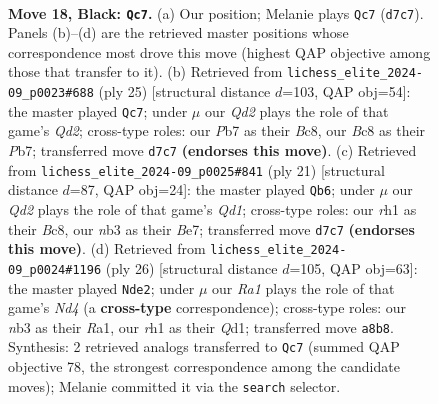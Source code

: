 \documentclass[11pt]{article}
\begin{document}
\begin{figure}[p]
\label{fig:thought-m33}
\end{figure}

\clearpage

\begin{figure}[p]\centering
\begin{subfigure}{0.46\textwidth}\centering
\resizebox{\linewidth}{!}{%
\newchessgame
\chessboard[
  setfen={r1b2kr1/1p1qbp1p/p3n1p1/2Ppn3/8/1NK3N1/PP3PPP/1RBQ1B1R b - - 5 18},
  showmover=false,
  pgfstyle=straightmove, color=movearrow, markmove={d7-c7}
]}
\caption{}
\end{subfigure}\hfill
\begin{subfigure}{0.46\textwidth}\centering
\resizebox{\linewidth}{!}{%
\newchessgame
\chessboard[
  setfen={r1b1k2r/1p1q1ppp/p2bpn2/8/8/1N1B4/PPP2PPP/R1BQR1K1 b kq - 5 13},
  showmover=false,
  pgfstyle=straightmove, color=movearrow, markmove={d7-c7}
]}
\caption{}
\end{subfigure}
\\[4pt]
\begin{subfigure}{0.46\textwidth}\centering
\resizebox{\linewidth}{!}{%
\newchessgame
\chessboard[
  setfen={r1bq1rk1/pp2bpp1/2n2n1p/3p4/7B/2NQPN2/PP2BPPP/R3K2R b KQ - 1 11},
  showmover=false,
  pgfstyle=straightmove, color=movearrow, markmove={d8-b6}
]}
\caption{}
\end{subfigure}\hfill
\begin{subfigure}{0.46\textwidth}\centering
\resizebox{\linewidth}{!}{%
\newchessgame
\chessboard[
  setfen={r2qrbk1/pppb1pp1/3p1nnp/8/P2NP3/2N3PP/1PP2PB1/R1BQR1K1 w - - 0 14},
  showmover=false,
  pgfstyle=straightmove, color=movearrow, markmove={d4-e2}
]}
\caption{}
\end{subfigure}
\caption{\textbf{Move 18, Black: \texttt{Qc7}.} (a) Our position; Melanie plays \texttt{Qc7} (\texttt{d7c7}). Panels (b)--(d) are the retrieved master positions whose correspondence most drove this move (highest QAP objective among those that transfer to it). (b) Retrieved from \texttt{lichess\_elite\_2024-09\_p0023\#688} (ply 25) [structural distance $d$=103, QAP obj=54]: the master played \texttt{Qc7}; under $\mu$ our \emph{Qd2} plays the role of that game's \emph{Qd2}; cross-type roles: our \emph{P}b7 as their \emph{B}c8, our \emph{B}c8 as their \emph{P}b7; transferred move \texttt{d7c7} \textbf{(endorses this move)}. (c) Retrieved from \texttt{lichess\_elite\_2024-09\_p0025\#841} (ply 21) [structural distance $d$=87, QAP obj=24]: the master played \texttt{Qb6}; under $\mu$ our \emph{Qd2} plays the role of that game's \emph{Qd1}; cross-type roles: our \emph{r}h1 as their \emph{B}c8, our \emph{n}b3 as their \emph{B}e7; transferred move \texttt{d7c7} \textbf{(endorses this move)}. (d) Retrieved from \texttt{lichess\_elite\_2024-09\_p0024\#1196} (ply 26) [structural distance $d$=105, QAP obj=63]: the master played \texttt{Nde2}; under $\mu$ our \emph{Ra1} plays the role of that game's \emph{Nd4} (a \textbf{cross-type} correspondence); cross-type roles: our \emph{n}b3 as their \emph{R}a1, our \emph{r}h1 as their \emph{Q}d1; transferred move \texttt{a8b8}. Synthesis: 2 retrieved analogs transferred to \texttt{Qc7} (summed QAP objective 78, the strongest correspondence among the candidate moves); Melanie committed it via the \texttt{search} selector.}

\end{figure}
\end{document}
